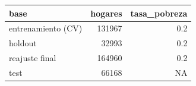 
\begin{tabular}{lrr}
\toprule
base & hogares & tasa\_pobreza\\
\midrule
entrenamiento (CV) & 131967 & 0.2\\
holdout & 32993 & 0.2\\
reajuste final & 164960 & 0.2\\
test & 66168 & NA\\
\bottomrule
\end{tabular}
